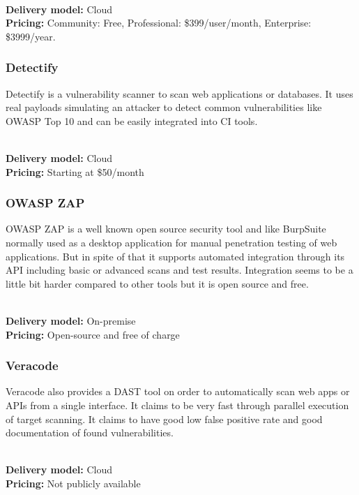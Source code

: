 \documentclass[conference]{IEEEtran}
\begin{document}
\noindent\\
\textbf{Delivery model:} Cloud
\noindent\\
\textbf{Pricing:} Community: Free, Professional: \$399/user/month, Enterprise: \$3999/year. 
\\


\noindent
\subsubsection{Detectify \cite{dast5}}

Detectify is a vulnerability scanner to scan web applications or databases. It uses real payloads simulating an attacker to detect common vulnerabilities like OWASP Top 10 and can be easily integrated into CI tools.

\noindent\\
\textbf{Delivery model:} Cloud
\noindent\\
\textbf{Pricing:} Starting at \$50/month
\\

\noindent
\subsubsection{OWASP ZAP \cite{dast6}}

OWASP ZAP is a well known open source security tool and like BurpSuite normally used as a desktop application for manual penetration testing of web applications. But in spite of that it supports automated integration through its API including basic or advanced scans and test results. Integration seems to be a little bit harder compared to other tools but it is open source and free.

\noindent\\
\textbf{Delivery model:} On-premise
\noindent\\
\textbf{Pricing:} Open-source and free of charge
\\
\noindent

\subsubsection{Veracode \cite{dast7}}

Veracode also provides a DAST tool on order to automatically scan web apps or APIs from a single interface. It claims to be very fast through parallel execution of target scanning. It claims to have good low false positive rate and good documentation of found vulnerabilities.

\noindent\\
\textbf{Delivery model:} Cloud
\noindent\\
\textbf{Pricing:} Not publicly available
\\
\end{document}
